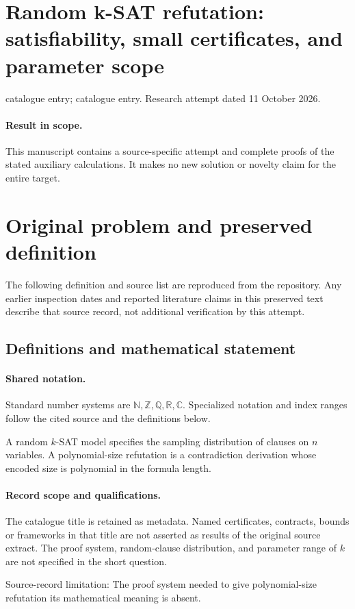 \documentclass[11pt]{article}
\begin{document}
\section*{Random k-SAT refutation: satisfiability, small certificates, and parameter scope}
\noindent catalogue entry; catalogue entry. Research attempt dated 11 October 2026.
\paragraph{Result in scope.}This manuscript contains a source-specific attempt and complete proofs of the stated auxiliary calculations. It makes no new solution or novelty claim for the entire target.
\section{Original problem and preserved definition}
The following definition and source list are reproduced from the repository. Any earlier inspection dates and reported literature claims in this preserved text describe that source record, not additional verification by this attempt.
\subsection{Definitions and mathematical statement}

\paragraph{Shared notation.}Standard number systems are $\mathbb N,\mathbb Z,\mathbb Q,\mathbb R,\mathbb C$. Specialized notation and index ranges follow the cited source and the definitions below.


A random $k$-SAT model specifies the sampling distribution of clauses on $n$ variables. A polynomial-size refutation is a contradiction derivation whose encoded size is polynomial in the formula length.
\paragraph{Record scope and qualifications.}
The catalogue title is retained as metadata. Named certificates, contracts, bounds or frameworks in that title are not asserted as results of the original source extract.
The proof system, random-clause distribution, and parameter range of $k$ are not specified in the short question.

Source-record limitation: The proof system needed to give polynomial-size refutation its mathematical meaning is absent.
\end{document}
